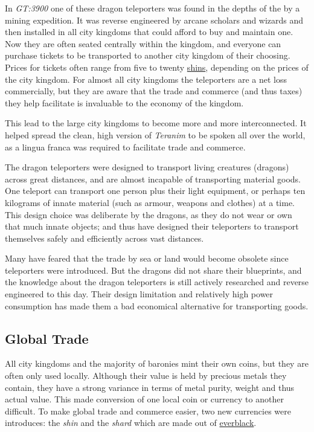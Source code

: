In \emph{GT:3900} one of these dragon teleporters was found in the depths of
the  by a mining expedition. It was reverse
engineered by arcane scholars and wizards and then installed in all city
kingdoms that could afford to buy and maintain one. Now they are often seated
centrally within the kingdom, and everyone can purchase tickets to be
transported to another city kingdom of their choosing. Prices for tickets
often range from five to twenty \hyperref[sec:Shin]{shins}, depending on the
prices of the city kingdom. For almost all city kingdoms the teleporters are a
net loss commercially, but they are aware that the trade and commerce (and
thus taxes) they help facilitate is invaluable to the economy of the kingdom.

This lead to the large city kingdoms to become more and more interconnected.
It helped spread the clean, high version of \emph{Teranim} to be spoken all
over the world, as a lingua franca was required to facilitate trade and
commerce.

The dragon teleporters were designed to transport living creatures (dragons)
across great distances, and are almost incapable of transporting material
goods. One teleport can transport one person plus their light equipment, or
perhaps ten kilograms of innate material (such as armour, weapons and
clothes) at a time. This design choice was deliberate by the dragons, as they
do not wear or own that much innate objects; and thus have designed their
teleporters to transport themselves safely and efficiently across vast
distances.

Many have feared that the trade by sea or land would become obsolete since
teleporters were introduced. But the dragons did not share their blueprints,
and the knowledge about the dragon teleporters is still actively researched
and reverse engineered to this day. Their design limitation and relatively
high power consumption has made them a bad economical alternative for
transporting goods.

\subsection{Global Trade}
\label{sec:Trade}

All city kingdoms and the majority of baronies mint their own coins, but they
are often only used locally. Although their value is held by precious metals
they contain, they have a strong variance in terms of metal purity, weight and
thus actual value. This made conversion of one local coin or currency to
another difficult. To make global trade and commerce easier, two new
currencies were introduces: the \emph{shin} and the \emph{shard} which are
made out of \hyperref[sec:Everblack]{everblack}.

